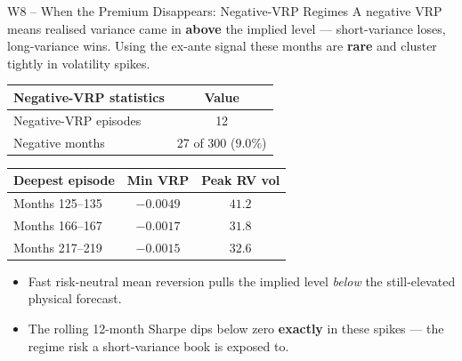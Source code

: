 \documentclass[aspectratio=169, 11pt]{beamer}
\begin{document}
\begin{frame}{W8 -- When the Premium Disappears: Negative-VRP Regimes}
\small
A negative VRP means realised variance came in \textbf{above} the implied level ---
short-variance loses, long-variance wins. Using the ex-ante signal these months are
\textbf{rare} and cluster tightly in volatility spikes.

\medskip
\begin{center}
\begin{tabular}{lc}
  \toprule
  Negative-VRP statistics & Value \\
  \midrule
  Negative-VRP episodes & 12 \\
  Negative months & 27 of 300 \;($9.0\%$) \\
  \bottomrule
\end{tabular}
\qquad
\begin{tabular}{lcc}
  \toprule
  Deepest episode & Min VRP & Peak RV vol \\
  \midrule
  Months 125--135 & $-0.0049$ & $41.2$ \\
  Months 166--167 & $-0.0017$ & $31.8$ \\
  Months 217--219 & $-0.0015$ & $32.6$ \\
  \bottomrule
\end{tabular}
\end{center}

\medskip
\begin{itemize}
  \item Fast risk-neutral mean reversion pulls the implied level \textit{below} the still-elevated physical forecast.
  \item The rolling 12-month Sharpe dips below zero \textbf{exactly} in these spikes --- the regime risk a short-variance book is exposed to.
\end{itemize}
\end{frame}
\end{document}
